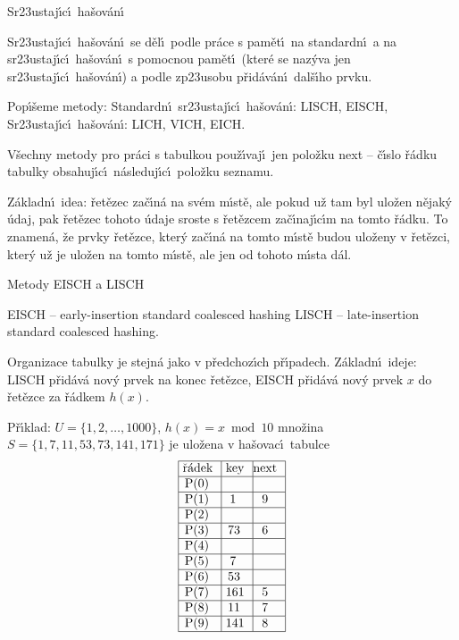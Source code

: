 \heading
Sr\accent23ustaj\'\i c\'\i\ ha\v sov\'an\'\i
\endheading

\flushpar Sr\accent23ustaj\'\i c\'\i\ ha\v sov\'an\'\i\ se d\v el\'\i\ podle pr\'ace s 
pam\v et\'\i\ na standardn\'\i\ a na sr\accent23ustaj\'\i c\'\i\ ha\v sov\'an\'\i\ 
s pomocnou pam\v et\'\i\ (kter\'e se naz\'yva jen 
sr\accent23ustaj\'\i c\'\i\ ha\v sov\'an\'\i ) a podle zp\accent23usobu 
p\v rid\'av\'an\'\i\ dal\v s\'\i ho prvku.
\medskip

\flushpar Pop\'\i\v seme metody:\newline 
\phantom{---}Standardn\'\i\ sr\accent23ustaj\'\i c\'\i\ ha\v sov\'an\'\i: LISCH, EISCH,\newline 
\phantom{---}Sr\accent23ustaj\'\i c\'\i\ ha\v sov\'an\'\i : LICH, VICH, EICH.
\medskip

\flushpar V\v sechny metody pro pr\'aci s tabulkou pou\v z\'\i vaj\'\i\ jen 
polo\v zku next -- \v c\'\i slo \v r\'adku tabulky obsahuj\'\i c\'\i\ 
n\'asleduj\'\i c\'\i\ polo\v zku seznamu. 

\flushpar Z\'akladn\'\i\ idea: \v ret\v ezec za\v c\'\i n\'a na sv\'em m\'\i st\v e, ale 
pokud u\v z tam byl ulo\v zen 
n\v ejak\'y \'udaj, pak \v ret\v ezec tohoto \'udaje sroste s \v ret\v ezcem 
za\v c\'\i naj\'\i c\'\i m na tomto \v r\'adku. To znamen\'a, \v ze prvky \v ret\v ezce, kter\'y za\v c\'\i n\'a na tomto m\'\i st\v e budou ulo\v zeny v \v ret\v ezci, kter\'y u\v z je ulo\v zen na tomto m\'\i st\v e, ale jen od tohoto m\'\i sta d\'al.
\medskip

\subhead
Metody EISCH a LISCH
\endsubhead

\phantom{---}EISCH -- early-insertion standard coalesced hashing\newline 
\phantom{---}LISCH -- late-insertion standard coalesced hashing.
 
\flushpar Organizace tabulky je stejn\'a jako v p\v redchoz\'\i ch 
p\v r\'\i padech.\newline 
Z\'akladn\'\i\ ideje: LISCH p\v rid\'av\'a nov\'y prvek na konec 
\v ret\v ezce, \newline 
EISCH p\v rid\'av\'a nov\'y prvek $x$ do \v ret\v ezce za 
\v r\'adkem $h(x)$.\newline 

\flushpar P\v r\'\i klad: $U=\{1,2,\dots,1000\}$, $h(x)=x\bmod10$\newline 
mno\v zina $S=\{1,7,11,53,73,141,171\}$ je ulo\v zena 
v ha\v sovac\'\i\ tabulce
$$\vtop{\offinterlineskip\halign {\strut\vrule\ # & \vrule\ # & \vrule \hfil # \hfil \vrule\cr\noalign{\hrule}\v r\'adek & key & next \hfil \cr\noalign{\hrule}P(0) & &\hfill \cr\noalign{\hrule}P(1) & 1 & 9 \cr\noalign{\hrule}P(2) & &\hfill \cr\noalign{\hrule}P(3) & 73 & 6 \cr\noalign{\hrule}P(4) &  &\hfill \cr\noalign{\hrule}P(5) & 7 & \hfill \cr\noalign{\hrule}P(6) & 53 &\hfill \cr\noalign{\hrule}P(7) & 161 & 5 \cr\noalign{\hrule}P(8) & 11 & 7  \cr\noalign{\hrule}P(9) & 141 & 8 \cr\noalign{\hrule}}}$$

